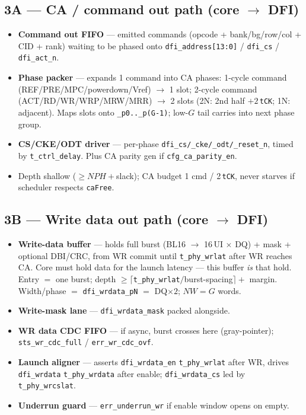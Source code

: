 \documentclass[11pt]{article}
\newcommand{\sig}[1]{\texttt{#1}}
\newcommand{\reg}[1]{\texttt{#1}}
\begin{document}
\subsection{3A --- CA / command out path (core $\to$ DFI)}
\begin{itemize}[nosep,leftmargin=1.4em]
  \item \textbf{Command out FIFO} --- emitted commands (opcode + bank/bg/row/col + CID +
    rank) waiting to be phased onto \sig{dfi\_address[13:0]} / \sig{dfi\_cs} / \sig{dfi\_act\_n}.
  \item \textbf{Phase packer} --- expands 1 command into CA phases: 1-cycle command
    (REF/PRE/MPC/powerdown/Vref) $\to$ 1 slot; 2-cycle command (ACT/RD/WR/WRP/MRW/MRR)
    $\to$ 2 slots (2N: 2nd half $+2$\,\sig{tCK}; 1N: adjacent). Maps slots onto
    \sig{\_p0..\_p(G-1)}; low-$G$ tail carries into next phase group.
  \item \textbf{CS/CKE/ODT driver} --- per-phase \sig{dfi\_cs/\_cke/\_odt/\_reset\_n},
    timed by \sig{t\_ctrl\_delay}. Plus CA parity gen if \reg{cfg\_ca\_parity\_en}.
  \item Depth shallow ($\ge NPH+$slack); CA budget 1 cmd / 2\,\sig{tCK}, never starves if
    scheduler respects \sig{caFree}.
\end{itemize}

\subsection{3B --- Write data out path (core $\to$ DFI)}
\begin{itemize}[nosep,leftmargin=1.4em]
  \item \textbf{Write-data buffer} --- holds full burst (BL16 $\to$ 16\,UI $\times$ DQ) + mask
    + optional DBI/CRC, from WR commit until \sig{t\_phy\_wrlat} after WR reaches CA. Core
    must hold data for the launch latency --- this buffer \emph{is} that hold. Entry $=$ one
    burst; depth $\ge \lceil$\sig{t\_phy\_wrlat}$/$burst-spacing$\rceil +$ margin. Width/phase
    $=$ \sig{dfi\_wrdata\_pN} $=$ DQ$\times2$; $NW=G$ words.
  \item \textbf{Write-mask lane} --- \sig{dfi\_wrdata\_mask} packed alongside.
  \item \textbf{WR data CDC FIFO} --- if async, burst crosses here (gray-pointer);
    \reg{sts\_wr\_cdc\_full} / \reg{err\_wr\_cdc\_ovf}.
  \item \textbf{Launch aligner} --- asserts \sig{dfi\_wrdata\_en} \sig{t\_phy\_wrlat} after WR,
    drives \sig{dfi\_wrdata} \sig{t\_phy\_wrdata} after enable; \sig{dfi\_wrdata\_cs} led by
    \sig{t\_phy\_wrcslat}.
  \item \textbf{Underrun guard} --- \reg{err\_underrun\_wr} if enable window opens on empty.
\end{itemize}
\end{document}
